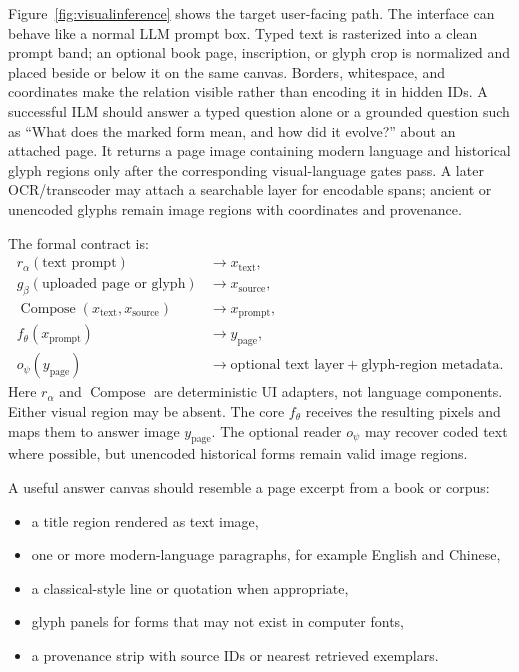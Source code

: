 \documentclass[11pt]{article}
\begin{document}
Figure~\ref{fig:visualinference} shows the target user-facing path. The interface can
behave like a normal LLM prompt box. Typed text is rasterized into a clean prompt
band; an optional book page, inscription, or glyph crop is normalized and placed
beside or below it on the same canvas. Borders, whitespace, and coordinates make
the relation visible rather than encoding it in hidden IDs. A successful ILM should
answer a typed question alone or a grounded question such as ``What does the
marked form mean, and how did it evolve?'' about an attached page. It returns a
page image containing modern language and historical glyph regions only after
the corresponding visual-language gates pass. A later
OCR/transcoder may attach a searchable layer for encodable spans; ancient or
unencoded glyphs remain image regions with coordinates and provenance.

The formal contract is:
\[
\begin{aligned}
r_\alpha(\text{text prompt}) &\rightarrow x_{\mathrm{text}},\\
g_\beta(\text{uploaded page or glyph}) &\rightarrow x_{\mathrm{source}},\\
\operatorname{Compose}(x_{\mathrm{text}},x_{\mathrm{source}})&\rightarrow x_{\mathrm{prompt}},\\
f_\theta(x_{\mathrm{prompt}}) &\rightarrow y_{\mathrm{page}},\\
o_\psi(y_{\mathrm{page}}) &\rightarrow \text{optional text layer} + \text{glyph-region metadata}.
\end{aligned}
\]
Here \(r_\alpha\) and \(\operatorname{Compose}\) are deterministic UI adapters,
not language components. Either visual region may be absent. The core
$f_\theta$ receives the resulting pixels and maps them to answer image
$y_{\mathrm{page}}$. The optional reader $o_\psi$ may recover coded text where
possible, but unencoded historical forms remain valid image regions.

A useful answer canvas should resemble a page excerpt from a book or corpus:
\begin{itemize}[leftmargin=*]
  \item a title region rendered as text image,
  \item one or more modern-language paragraphs, for example English and Chinese,
  \item a classical-style line or quotation when appropriate,
  \item glyph panels for forms that may not exist in computer fonts,
  \item a provenance strip with source IDs or nearest retrieved exemplars.
\end{itemize}
\end{document}
